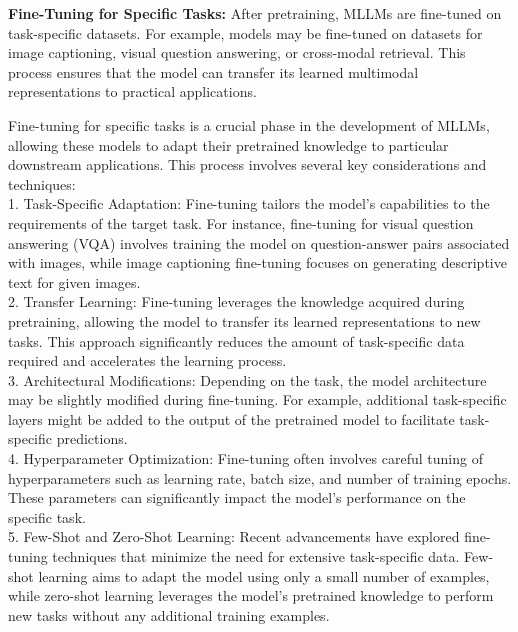 
\textbf{Fine-Tuning for Specific Tasks:} After pretraining, MLLMs are fine-tuned on task-specific datasets. For example, models may be fine-tuned on datasets for image captioning, visual question answering, or cross-modal retrieval. This process ensures that the model can transfer its learned multimodal representations to practical applications.

Fine-tuning for specific tasks is a crucial phase in the development of MLLMs, allowing these models to adapt their pretrained knowledge to particular downstream applications. This process involves several key considerations and techniques:
\\
1. Task-Specific Adaptation: Fine-tuning tailors the model's capabilities to the requirements of the target task. For instance, fine-tuning for visual question answering (VQA) involves training the model on question-answer pairs associated with images, while image captioning fine-tuning focuses on generating descriptive text for given images.
\\
2. Transfer Learning: Fine-tuning leverages the knowledge acquired during pretraining, allowing the model to transfer its learned representations to new tasks. This approach significantly reduces the amount of task-specific data required and accelerates the learning process.
\\
3. Architectural Modifications: Depending on the task, the model architecture may be slightly modified during fine-tuning. For example, additional task-specific layers might be added to the output of the pretrained model to facilitate task-specific predictions.
\\
4. Hyperparameter Optimization: Fine-tuning often involves careful tuning of hyperparameters such as learning rate, batch size, and number of training epochs. These parameters can significantly impact the model's performance on the specific task.
\\
5. Few-Shot and Zero-Shot Learning: Recent advancements have explored fine-tuning techniques that minimize the need for extensive task-specific data. Few-shot learning aims to adapt the model using only a small number of examples, while zero-shot learning leverages the model's pretrained knowledge to perform new tasks without any additional training examples.
